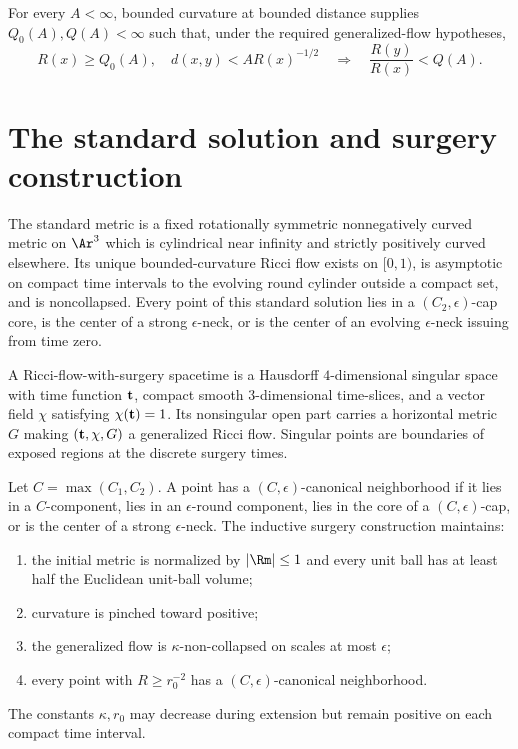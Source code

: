 For every $A<\infty$, bounded curvature at bounded distance supplies
$Q_0(A),Q(A)<\infty$ such that, under the required generalized-flow
hypotheses,
\[
  R(x)\geq Q_0(A),\quad
  d(x,y)<A R(x)^{-1/2}
  \quad\Longrightarrow\quad
  \frac{R(y)}{R(x)}<Q(A).
\]

\section{The standard solution and surgery construction}

The standard metric is a fixed rotationally symmetric nonnegatively curved
metric on $\Ar^3$ which is cylindrical near infinity and strictly positively
curved elsewhere. Its unique bounded-curvature Ricci flow exists on $[0,1)$,
is asymptotic on compact time intervals to the evolving round cylinder outside
a compact set, and is noncollapsed. Every point of this standard solution lies
in a $(C_2,\epsilon)$-cap core, is the center of a strong $\epsilon$-neck, or
is the center of an evolving $\epsilon$-neck issuing from time zero.

A Ricci-flow-with-surgery spacetime is a Hausdorff $4$-dimensional singular
space with time function ${\bf t}$, compact smooth $3$-dimensional time-slices,
and a vector field $\chi$ satisfying $\chi({\bf t})=1$. Its nonsingular open
part carries a horizontal metric $G$ making
$({\bf t},\chi,G)$ a generalized Ricci flow. Singular points are boundaries of
exposed regions at the discrete surgery times.

Let $C=\max(C_1,C_2)$. A point has a $(C,\epsilon)$-canonical neighborhood if
it lies in a $C$-component, lies in an $\epsilon$-round component, lies in the
core of a $(C,\epsilon)$-cap, or is the center of a strong $\epsilon$-neck.
The inductive surgery construction maintains:
\begin{enumerate}
\item the initial metric is normalized by $|\Rm|\leq1$ and every unit ball has
at least half the Euclidean unit-ball volume;
\item curvature is pinched toward positive;
\item the generalized flow is $\kappa$-non-collapsed on scales at most
$\epsilon$;
\item every point with $R\geq r_0^{-2}$ has a
$(C,\epsilon)$-canonical neighborhood.
\end{enumerate}
The constants $\kappa,r_0$ may decrease during extension but remain positive
on each compact time interval.

